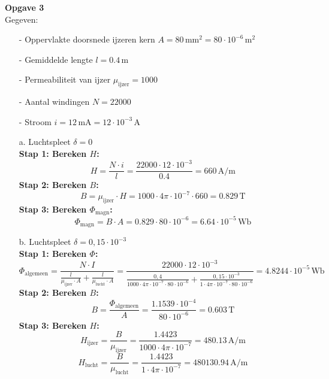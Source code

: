 \newpage
\textbf{Opgave 3}\\
Gegeven:
\begin{enumerate}
    \item[-] Oppervlakte doorsnede ijzeren kern \( A = 80 \, \text{mm}^2 = 80 \cdot 10^{-6} \, \text{m}^2 \)
    \item[-] Gemiddelde lengte \( l = 0.4 \, \text{m} \)
    \item[-] Permeabiliteit van ijzer \( \mu_{\text{ijzer}} = 1000 \)
    \item[-] Aantal windingen \( N = 22000 \)
    \item[-] Stroom \( i = 12 \, \text{mA} = 12 \cdot 10^{-3} \, \text{A} \)
\end{enumerate}

\begin{enumerate}
    \item [a.]Luchtspleet \( \delta = 0 \)\\
        \textbf{Stap 1: Bereken \( H \):} 
        \[ H = 
            \frac{N \cdot i}{l} = \frac{22000 \cdot 12 \cdot 10^{-3}}{0.4} = 660 \, \text{A/m} \]
        \textbf{Stap 2: Bereken \( B \):} 
        \[ B = 
            \mu_{\text{ijzer}} \cdot H = 1000 \cdot 4\pi \cdot 10^{-7} \cdot 660 = 0.829 \, \text{T} \]
        \textbf{Stap 3: Bereken \( \Phi_{\text{magn}} \):} 
        \[ \Phi_{\text{magn}} = 
            B \cdot A = 0.829 \cdot 80 \cdot 10^{-6} = 6.64 \cdot 10^{-5} \, \text{Wb} \]

    \item [b.]Luchtspleet \( \delta = 0,15 \cdot 10^{-3}  \)\\
        \textbf{Stap 1: Bereken \( \Phi \):} 
        \[ \Phi_{\text{algemeen}} = 
            \frac{N \cdot I}{\frac{l}{\mu_{\text{ijzer}} \cdot A} + \frac{l}{\mu_{\text{lucht}} \cdot A}}  =    \frac{22000 \cdot 12 \cdot 10^{-3}}{\frac{0,4}{1000 \cdot 4\pi \cdot 10^{-7} \cdot 80 \cdot 10^{-6}} + \frac{0,15 \cdot 10^{-3}}{1 \cdot 4\pi \cdot 10^{-7} \cdot 80 \cdot 10^{-6}}} = 4.8244 \cdot 10^{-5} \, \text{Wb} \]
        \textbf{Stap 2: Bereken \( B \):} 
        \[ B = 
            \frac{\Phi_{\text{algemeen}}}{A} = \frac{1.1539 \cdot 10^{-4}}{80 \cdot 10^{-6}} = 0.603 \, \text{T} \]
        \textbf{Stap 3: Bereken \( H \):}
        \[ H_{\text{ijzer}} = 
            \frac{B}{\mu_{\text{ijzer}}} = \frac{1.4423}{1000 \cdot 4\pi \cdot 10^{-7}} = 480.13 \, \text{A/m} \]
        \[ H_{\text{lucht}} = 
            \frac{B}{\mu_{\text{lucht}}} = \frac{1.4423}{1 \cdot 4\pi \cdot 10^{-7}} = 480130.94 \, \text{A/m} \]


\end{enumerate}
